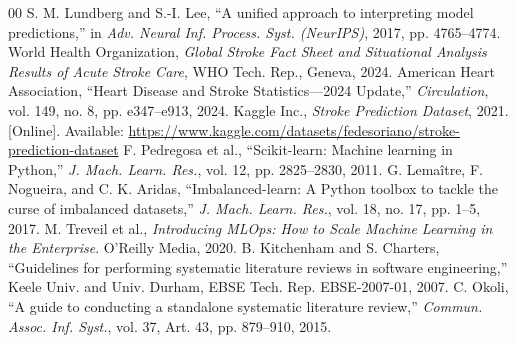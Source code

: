 \documentclass[10pt,twocolumn,a4paper]{article}
\begin{document}
\begin{thebibliography}{00}
 S. M. Lundberg and S.-I. Lee, ``A unified approach to interpreting model predictions,'' in \textit{Adv. Neural Inf. Process. Syst. (NeurIPS)}, 2017, pp. 4765--4774.
 World Health Organization, \textit{Global Stroke Fact Sheet and Situational Analysis Results of Acute Stroke Care}, WHO Tech. Rep., Geneva, 2024.
 American Heart Association, ``Heart Disease and Stroke Statistics---2024 Update,'' \textit{Circulation}, vol. 149, no. 8, pp. e347--e913, 2024.
 Kaggle Inc., \textit{Stroke Prediction Dataset}, 2021. [Online]. Available: \url{https://www.kaggle.com/datasets/fedesoriano/stroke-prediction-dataset}
 F. Pedregosa et al., ``Scikit-learn: Machine learning in Python,'' \textit{J. Mach. Learn. Res.}, vol. 12, pp. 2825--2830, 2011.
 G. Lema\^{i}tre, F. Nogueira, and C. K. Aridas, ``Imbalanced-learn: A Python toolbox to tackle the curse of imbalanced datasets,'' \textit{J. Mach. Learn. Res.}, vol. 18, no. 17, pp. 1--5, 2017.
 M. Treveil et al., \textit{Introducing MLOps: How to Scale Machine Learning in the Enterprise}. O'Reilly Media, 2020.
 B. Kitchenham and S. Charters, ``Guidelines for performing systematic literature reviews in software engineering,'' Keele Univ. and Univ. Durham, EBSE Tech. Rep. EBSE-2007-01, 2007.
 C. Okoli, ``A guide to conducting a standalone systematic literature review,'' \textit{Commun. Assoc. Inf. Syst.}, vol. 37, Art. 43, pp. 879--910, 2015.
\end{thebibliography}
\end{document}
